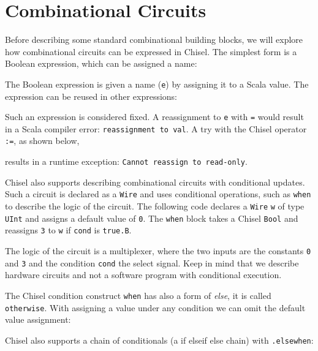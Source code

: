 \documentclass[%
    10pt,
    headinclude, footexclude,
    openright, %
    notitlepage,
    cleardoubleempty,
    headsepline,
    pointlessnumbers,
    bibtotoc, idxtotoc,
    ]{scrbook}
\newcommand{\code}[1]{{\small{\texttt{#1}}}}
\begin{document}
\section{Combinational Circuits}

Before describing some standard combinational building blocks, we will explore
how combinational circuits can be expressed in Chisel.
The simplest form is a Boolean expression, which can be assigned a name:


\noindent The Boolean expression is given a name (\code{e}) by assigning it
to a Scala value. The expression can be reused in other expressions:


Such an expression is considered fixed. A reassignment to \code{e}
with \code{=} would result in a Scala compiler error: \code{reassignment to val}.
A try with the Chisel operator \code{:=}, as shown below,


\noindent results in a runtime exception: \code{Cannot reassign to read-only}.

Chisel also supports describing combinational circuits with conditional updates.
Such a circuit is declared as a \code{Wire} and uses conditional operations,
such as \code{when} to describe the logic of the circuit.
The following code declares a \code{Wire} \code{w} of type \code{UInt} and assigns a default
value of \code{0}. The \code{when} block takes a Chisel \code{Bool} and reassigns
\code{3} to \code{w} if \code{cond} is \code{true.B}.


\noindent The logic of the circuit is a multiplexer, where the two inputs are the constants
\code{0} and \code{3} and the condition \code{cond} the select signal.
Keep in mind that we describe hardware circuits and not a software program with conditional
execution.

The Chisel condition construct \code{when} has also a form of \emph{else}, it is called
\code{otherwise}. With assigning a value under any condition we can omit the default
value assignment:


Chisel also supports a chain of conditionals (a if elseif else chain) with \code{.elsewhen}:

\end{document}
